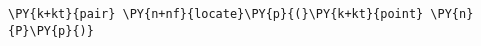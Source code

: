 \begin{Verbatim}[commandchars=\\\{\}]
    \PY{k+kt}{pair} \PY{n+nf}{locate}\PY{p}{(}\PY{k+kt}{point} \PY{n}{P}\PY{p}{)}
\end{Verbatim}
